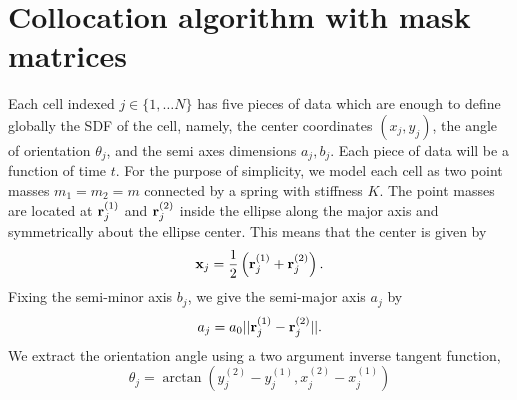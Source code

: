 \section{Collocation algorithm with mask matrices}
Each cell indexed $j \in \{1, \ldots N\}$ has five pieces of data which are enough to define globally the 
SDF of the cell, namely, the center coordinates $(x_j,y_j)$, the angle of orientation $\theta_j$, 
and the semi axes dimensions $a_j, b_j$. Each piece of data will be a function of time $t$. For 
the purpose of simplicity, we model each cell as two point masses $m_1 = m_2 = m$ connected by a spring 
with stiffness $K$. The point masses are located at $\vb{r}_j^{(1)}$ and $\vb{r}_j^{(2)}$ inside the ellipse 
along the major axis and symmetrically about the ellipse center. This means that the center is given by 
\begin{equation*}
    \vb{x}_j = \frac{1}{2} \left(\vb{r}_j^{(1)} + \vb{r}_j^{(2)}\right).
\end{equation*}
Fixing the semi-minor axis $b_j$, we give the semi-major axis $a_j$ by 
\begin{equation*}
    a_j = a_0||\vb{r}_j^{(1)} - \vb{r}_j^{(2)}||.
\end{equation*}
We extract the orientation angle using a two argument inverse tangent function,
\begin{equation*}
    \theta_j = \arctan(y_j^{(2)} - y_j^{(1)},x_j^{(2)} - x_j^{(1)} )
\end{equation*}

